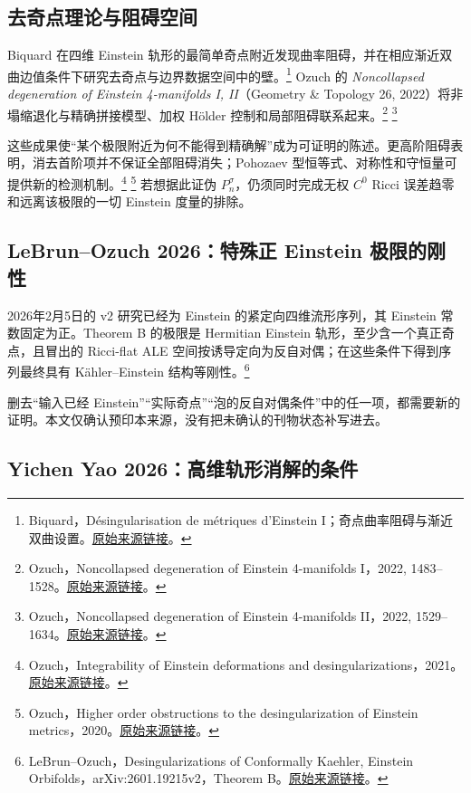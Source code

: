 \documentclass[11pt,a4paper]{article}
\theoremstyle{definition}
\newcommand{\src}[3]{\footnote{\raggedright #1，#2。\href{#3}{原始来源链接}。}}
\begin{document}
\subsection{去奇点理论与阻碍空间}

Biquard 在四维 Einstein 轨形的最简单奇点附近发现曲率阻碍，并在相应渐近双曲边值条件下研究去奇点与边界数据空间中的壁。\src{Biquard}{Désingularisation de métriques d'Einstein I；奇点曲率阻碍与渐近双曲设置}{https://arxiv.org/abs/1105.4904}
Ozuch 的 \emph{Noncollapsed degeneration of Einstein 4-manifolds I, II}（Geometry \& Topology 26, 2022）将非塌缩退化与精确拼接模型、加权 Hölder 控制和局部阻碍联系起来。\src{Ozuch}{Noncollapsed degeneration of Einstein 4-manifolds I，2022, 1483--1528}{https://doi.org/10.2140/gt.2022.26.1483}
\src{Ozuch}{Noncollapsed degeneration of Einstein 4-manifolds II，2022, 1529--1634}{https://doi.org/10.2140/gt.2022.26.1529}

这些成果使“某个极限附近为何不能得到精确解”成为可证明的陈述。更高阶阻碍表明，消去首阶项并不保证全部阻碍消失；Pohozaev 型恒等式、对称性和守恒量可提供新的检测机制。\src{Ozuch}{Integrability of Einstein deformations and desingularizations，2021}{https://arxiv.org/abs/2105.13193}
\src{Ozuch}{Higher order obstructions to the desingularization of Einstein metrics，2020}{https://arxiv.org/abs/2012.13316}
若想据此证伪 $P_n^\sigma$，仍须同时完成无权 $C^0$ Ricci 误差趋零和远离该极限的一切 Einstein 度量的排除。

\subsection{LeBrun--Ozuch 2026：特殊正 Einstein 极限的刚性}

2026年2月5日的 v2 研究已经为 Einstein 的紧定向四维流形序列，其 Einstein 常数固定为正。Theorem B 的极限是 Hermitian Einstein 轨形，至少含一个真正奇点，且冒出的 Ricci-flat ALE 空间按诱导定向为反自对偶；在这些条件下得到序列最终具有 Kähler--Einstein 结构等刚性。\src{LeBrun--Ozuch}{Desingularizations of Conformally Kaehler, Einstein Orbifolds，arXiv:2601.19215v2，Theorem B}{https://arxiv.org/html/2601.19215v2}

删去“输入已经 Einstein”“实际奇点”“泡的反自对偶条件”中的任一项，都需要新的证明。本文仅确认预印本来源，没有把未确认的刊物状态补写进去。

\subsection{Yichen Yao 2026：高维轨形消解的条件}
\end{document}
